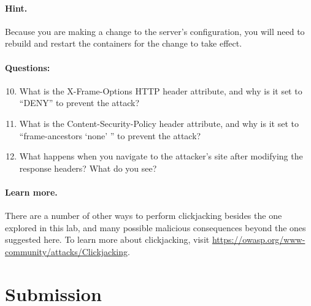 \paragraph{Hint.} Because you are making a change to the server's
configuration, you will need to rebuild and restart the containers for
the change to take effect.


\paragraph{Questions:}
\begin{enumerate}
\setcounter{enumi}{9}
    \item What is the X-Frame-Options HTTP header attribute, and why is
    it set to ``DENY'' to prevent the attack?

    \item What is the Content-Security-Policy header attribute, and why
    is it set to ``frame-ancestors `none' '' to prevent the attack?

    \item What happens when you navigate to the attacker's site
    after modifying the response headers? What do you see?
\end{enumerate}

\paragraph{Learn more.}
There are a number of other ways to perform clickjacking besides the one
explored in this lab, and many possible malicious consequences beyond
the ones suggested here. To learn more about clickjacking, visit
\href{https://owasp.org/www-community/attacks/Clickjacking}{https://owasp.org/www-community/attacks/Clickjacking}.

\section{Submission}

\begin{quote}
\seedsubmission
\end{quote}



